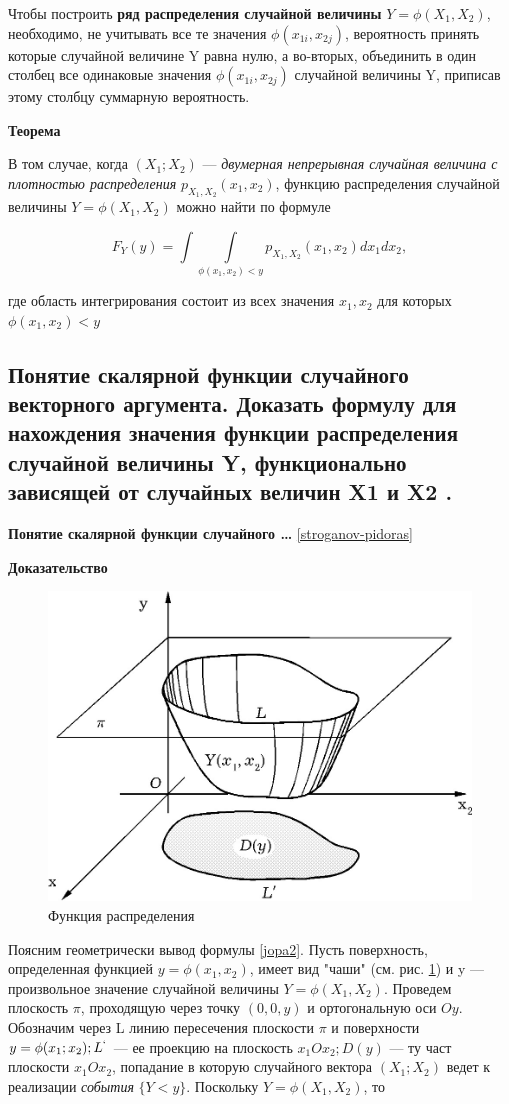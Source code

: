 Чтобы построить \textbf{ряд распределения случайной величины} $Y = \phi(X_1, X_2)$, необходимо, не учитывать все те значения $\phi(x_{1i}, x_{2j})$, вероятность принять которые случайной величине Y равна нулю, а во-вторых, объединить в один столбец все одинаковые значения $\phi(x_{1i}, x_{2j})$ случайной величины Y, приписав этому столбцу суммарную вероятность.

\textbf{Теорема}

В том случае, когда $(X_1; X_2)$ --- \textit{двумерная непрерывная случайная величина с плотностью распределения} $p_{X_1, X_2}(x_1, x_2)$, функцию распределения случайной величины $Y = \phi(X_1, X_2)$ можно найти по формуле

\begin{equation}
	\label{jopa2}
	F_Y(y) = \int\int\limits_{\phi(x_1, x_2) < y} p_{X_1, X_2}(x_1, x_2)dx_1dx_2, 
\end{equation}

где область интегрирования состоит из всех значения $x_1, x_2$ для которых $\phi(x_1, x_2) < y$

\subsection{Понятие скалярной функции случайного векторного аргумента. Доказать формулу для нахождения значения функции распределения случайной величины Y, функционально зависящей от случайных величин X1 и X2 .}

\textbf{Понятие скалярной функции случайного \dots} \ref{stroganov-pidoras}

\textbf{Доказательство}

\begin{figure}[ht!]
	\centering
	\includegraphics[width=0.6\linewidth]{assets/jopa-geom.png}
	\caption{Функция распределения}
	\label{fig:alg}
\end{figure}

Поясним геометрически вывод формулы \ref{jopa2}. Пусть поверхность, определенная функцией $y = \phi(x_1, x_2)$, имеет вид "чаши" (см. рис. \ref{fig:alg}) и y --- произвольное значение случайной величины $Y = \phi(X_1, X_2)$. Проведем плоскость $\pi$, проходящую через точку $(0, 0, y)$ и ортогональную оси $Oy$. Обозначим через L линию пересечения плоскости $\pi$ и поверхности $y = \phi(x_1;x_2); L^{`}$ --- ее проекцию на плоскость $x_1Ox_2; D(y)$ --- ту част плоскости $x_1Ox_2$, попадание в которую случайного вектора $(X_1;X_2)$ ведет к реализации \textit{события} $\{Y < y\}$. Поскольку $Y = \phi(X_1, X_2)$, то

